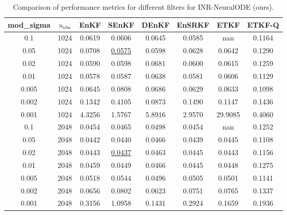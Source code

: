 \begin{table}[h]
	\centering
	\caption{Comparison of performance metrics for different filters for INR-NeuralODE (ours).}
	\label{tab:yin2023_comparison}
	\begin{tabular}{c c c c c c c c}
		\hline
		mod\_sigma & $n_{\textrm{obs}}$ & EnKF   & SEnKF              & DEnKF  & EnSRKF             & ETKF    & ETKF-Q \\
		\hline
		0.1        & 1024               & 0.0619 & 0.0606             & 0.0645 & 0.0585             & nan     & 0.1164 \\
		0.05       & 1024               & 0.0708 & \underline{0.0575} & 0.0598 & 0.0628             & 0.0642  & 0.1290 \\
		0.02       & 1024               & 0.0590 & 0.0598             & 0.0681 & 0.0600             & 0.0615  & 0.1259 \\
		0.01       & 1024               & 0.0578 & 0.0587             & 0.0638 & 0.0581             & 0.0606  & 0.1129 \\
		0.005      & 1024               & 0.0645 & 0.0808             & 0.0686 & 0.0629             & 0.0633  & 0.1098 \\
		0.002      & 1024               & 0.1342 & 0.4105             & 0.0873 & 0.1490             & 0.1147  & 0.1436 \\
		0.001      & 1024               & 4.3256 & 1.5767             & 5.8916 & 2.9570             & 29.9085 & 0.4060 \\
		\hline
		0.1        & 2048               & 0.0454 & 0.0465             & 0.0498 & 0.0454             & nan     & 0.1252 \\
		0.05       & 2048               & 0.0442 & 0.0440             & 0.0466 & 0.0439             & 0.0445  & 0.1108 \\
		0.02       & 2048               & 0.0443 & \underline{0.0437} & 0.0463 & 0.0445             & 0.0443  & 0.1156 \\
		0.01       & 2048               & 0.0459 & 0.0449             & 0.0466 & 0.0445             & 0.0448  & 0.1275 \\
		0.005      & 2048               & 0.0518 & 0.0544             & 0.0496 & 0.0505             & 0.0501  & 0.1141 \\
		0.002      & 2048               & 0.0656 & 0.0802             & 0.0623 & 0.0751             & 0.0765  & 0.1337 \\
		0.001      & 2048               & 0.3156 & 1.0958             & 0.1431 & 0.2924             & 0.1659  & 0.1936 \\

\end{tabular}
\end{table}
